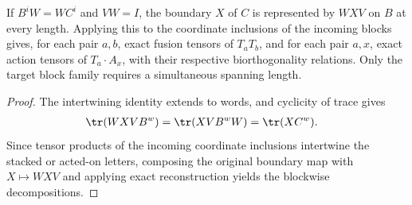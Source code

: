 \begin{lemma}
    \label{thm:glm_boundary_incoming_blocks}
    \leanok
    If $B^iW=WC^i$ and $VW=I$, the boundary $X$ of $C$ is represented
    by $WXV$ on $B$ at every length. Applying this to the coordinate
    inclusions of the incoming blocks gives, for each pair $a,b$,
    exact fusion tensors of $T_aT_b$, and for each pair $a,x$, exact
    action tensors of $T_a\cdot A_x$, with their respective biorthogonality
    relations. Only the target block family requires a simultaneous
    spanning length.
\end{lemma}
\begin{proof}
    \leanok
    The intertwining identity extends to words, and cyclicity of trace
    gives
    \begin{align}
        \tr(WXV B^w) & =\tr(XV B^wW)=\tr(XC^w).
        \label{eq:glm_boundary_restricted_trace}
    \end{align}
    Since tensor products of the incoming coordinate inclusions intertwine
    the stacked or acted-on letters, composing the original boundary map with
    $X\mapsto WXV$ and applying exact reconstruction yields the blockwise
    decompositions.
\end{proof}

